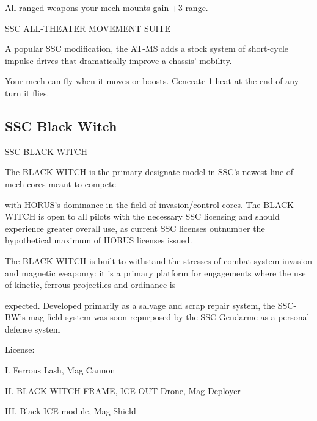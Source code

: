                                                                                                                   


All ranged weapons your mech mounts gain +3 range.
 

SSC ALL-THEATER MOVEMENT SUITE  

A popular SSC modification, the AT-MS adds a stock system of short-cycle impulse drives that dramatically  
improve a chassis’ mobility.   

Your mech can fly when it moves or boosts. Generate 1 heat at the end of any turn it flies.
 

                                                                                                                     
\subsection{SSC Black Witch}

                                                               
                                            SSC BLACK WITCH  

The BLACK WITCH is the primary designate model in SSC’s newest line of mech cores meant to compete  

with HORUS’s dominance in the field of invasion/control cores. The BLACK WITCH is open to all pilots with  
the necessary SSC licensing and should experience greater overall use, as current SSC licenses outnumber  
the hypothetical maximum of HORUS licenses issued.   

The BLACK WITCH is built to withstand the stresses of combat system invasion and magnetic weaponry: it  
is a primary platform for engagements where the use of kinetic, ferrous projectiles and ordinance is  

expected. Developed primarily as a salvage and scrap repair system, the SSC-BW’s mag field system was  
soon repurposed by the SSC Gendarme as a personal defense system    

                                                                                                                       


                                                  License:
 
I. Ferrous Lash, Mag Cannon
 
II. BLACK WITCH FRAME, ICE-OUT Drone, Mag Deployer
 
III. Black ICE module, Mag Shield
 

